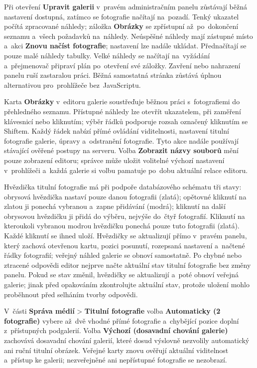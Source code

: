 \documentclass[11pt,a4paper]{article}
\newcommand{\ui}[1]{\textbf{#1}}
\begin{document}
Při otevření \ui{Upravit galerii} v~pravém administračním panelu zůstávají běžná
nastavení dostupná, zatímco se fotografie načítají na~pozadí. Tenký ukazatel
počítá zpracované náhledy; záložka \ui{Obrázky} se zpřístupní až~po~dokončení
seznamu a~všech požadavků na~náhledy. Neúspěšné náhledy mají zástupné místo
a~akci \ui{Znovu načíst fotografie}; nastavení lze nadále ukládat. Přednačítají
se pouze malé náhledy tabulky. Velké náhledy se načítají na~vyžádání
a~přejmenovač připraví plán po~otevření své záložky. Zavření nebo nahrazení
panelu ruší zastaralou práci. Běžná samostatná stránka zůstává úplnou
alternativou pro~prohlížeče bez~JavaScriptu.

Karta \ui{Obrázky} v~editoru galerie soustřeďuje běžnou práci s~fotografiemi do
přehledného seznamu. Přístupné náhledy lze otevřít ukazatelem, při zaměření
klávesnicí nebo kliknutím; výběr řádků podporuje rozsah označený kliknutím se
Shiftem. Každý řádek nabízí přímé ovládání viditelnosti, nastavení titulní
fotografie galerie, úpravy a~odstranění fotografie. Tyto akce nadále používají
stávající ověřené postupy na serveru. Volba \ui{Zobrazit názvy souborů} mění
pouze zobrazení editoru; správce může uložit volitelné výchozí nastavení
v~prohlížeči a~každá galerie si volbu pamatuje po~dobu aktuální relace editoru.

Hvězdička titulní fotografie má při podpoře databázového schématu tři stavy:
obrysová hvězdička nastaví pouze danou fotografii (zlatá); opětovné kliknutí na
zlatou ji ponechá vybranou a~zapne přidávání (modrá); kliknutí na další
obrysovou hvězdičku ji přidá do výběru, nejvýše do~čtyř fotografií. Kliknutí na
kteroukoli vybranou modrou hvězdičku ponechá pouze tuto fotografii (zlatá).
Každé kliknutí se ihned uloží. Hvězdičky se aktualizují přímo v~pravém panelu,
který zachová otevřenou kartu, pozici posunutí, rozepsaná nastavení a~načtené
řádky fotografií; veřejný náhled galerie se obnoví samostatně. Po chybné nebo
ztracené odpovědi editor nejprve načte aktuální stav titulní fotografie bez
změny panelu. Pokud se stav změnil, hvězdičky se aktualizují a~poté obnoví
veřejná galerie; jinak před opakováním zkontrolujte aktuální stav, protože
uložení mohlo proběhnout před selháním tvorby odpovědi.

V~části \ui{Správa médií} > \ui{Titulní fotografie} volba \ui{Automaticky (2
fotografie)} vybere až~dvě vhodné přímé fotografie a~chybějící pozice doplní
z~přístupných podgalerií. Volba \ui{Výchozí (dosavadní chování galerie)}
zachovává dosavadní chování galerií, které dosud výslovně nezvolily automatický
ani ruční titulní obrázek. Veřejné karty znovu ověřují aktuální viditelnost
a~přístup ke galerii; nezveřejněné ani nepřístupné fotografie se nezobrazí.
\end{document}
